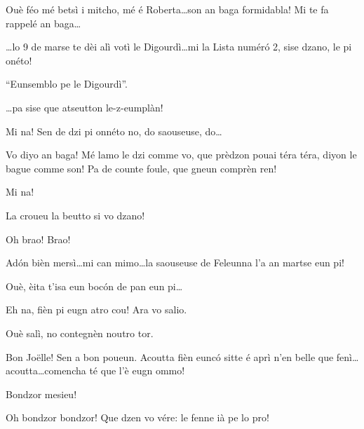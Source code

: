\begin{drama}
\Cimaspeaks Ouè féo mé betsì i mitcho, mé é Roberta\ldots son an baga formidabla! Mi te fa rappelé an baga\ldots


\Cimaspeaks \ldots lo 9 de marse te dèi alì votì le Digourdì\ldots mi la Lista num\'er\'o 2, sise dzano, le pi onéto!


\Jeanspeaks {} ``Eunsemblo pe le Digourdì''.

\Marcospeaks \ldots pa sise que atseutton le-z-eumplàn!

\Cimaspeaks Mi na! Sen de dzi pi onnéto no, do saouseuse, do\ldots

\Jeanspeaks  Vo diyo an baga! Mé lamo le dzi comme vo, que prèdzon pouai téra téra, diyon le bague comme son! Pa de counte foule, que gneun comprèn ren!

\Cimaspeaks Mi na! 

\Jeanspeaks La croueu la beutto si vo dzano!

\CimaMarcospeaks Oh brao! Brao!

\Cimaspeaks Ad\'on bièn mersì\ldots mi can mimo\ldots la saouseuse de Feleunna l'a an martse eun pi!

\Jeanspeaks Ouè, èita t'isa eun boc\'on de pan eun pi\ldots

\Cimaspeaks Eh na, fièn pi eugn atro cou! Ara vo salio.

\Marcospeaks Ouè  salì, no contegnèn noutro tor.




\Dallasspeaks Bon Jo\"{e}lle! Sen a bon poueun. Acoutta fièn eunc\'o sitte é aprì n'en belle que fenì\ldots acoutta\ldots comencha té que l'è eugn ommo!


\Joellespeaks Bondzor mesieu!

\Pompiolenspeaks Oh bondzor bondzor! Que dzen vo vére: le fenne ià pe lo pro!


\end{drama}

